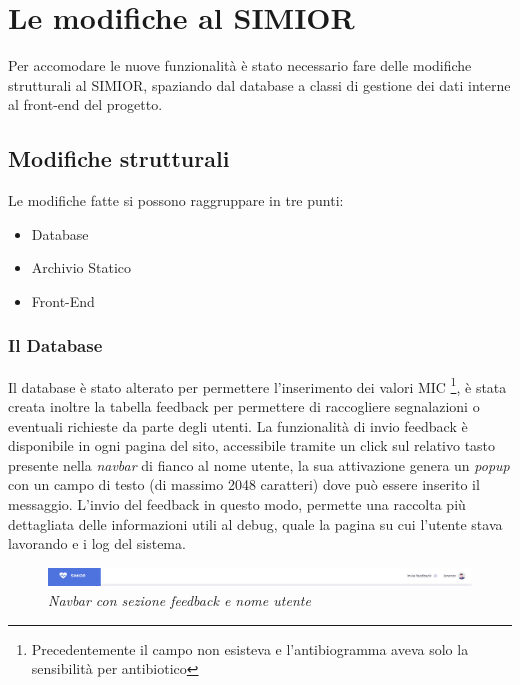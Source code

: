 \chapter{Le modifiche al SIMIOR}
Per accomodare le nuove funzionalità è stato necessario fare delle modifiche strutturali al SIMIOR, spaziando dal database a classi di gestione dei dati interne al front-end del progetto.
\section{Modifiche strutturali}\label{modifiche_strutturali}
Le modifiche fatte si possono raggruppare in tre punti:
\begin{itemize}
	\item Database
	\item Archivio Statico
	\item Front-End
\end{itemize}
\subsection{Il Database}
Il database è stato alterato per permettere l'inserimento dei valori MIC \footnote{Precedentemente il campo non esisteva e l'antibiogramma aveva solo la sensibilità per antibiotico}, è stata creata inoltre la tabella feedback per permettere di raccogliere segnalazioni o eventuali richieste da parte degli utenti.
La funzionalità di invio feedback è disponibile in ogni pagina del sito, accessibile tramite un click sul relativo tasto presente nella \textit{navbar} di fianco al nome utente, la sua attivazione genera un \textit{popup} con un campo di testo (di massimo 2048 caratteri) dove può essere inserito il messaggio. L'invio del feedback in questo modo, permette una raccolta più dettagliata delle informazioni utili al debug, quale la pagina su cui l'utente stava lavorando e i log del sistema.
\begin{figure}[h!]
	\centering
	\includegraphics[width=.99\columnwidth]{images/navbar}
	\caption{\textit{Navbar con sezione feedback e nome utente}}
	\label{fig:feature_location}
\end{figure}
\newline
